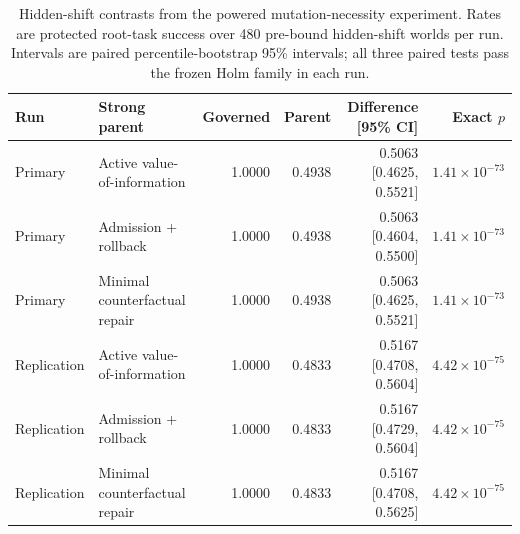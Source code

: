 \begin{table}[htbp]
\centering
\small
\setlength{\tabcolsep}{4pt}
\caption{Hidden-shift contrasts from the powered mutation-necessity experiment. Rates are protected root-task success over 480 pre-bound hidden-shift worlds per run. Intervals are paired percentile-bootstrap 95\% intervals; all three paired tests pass the frozen Holm family in each run.}
\label{tab:P1-T4}
\begin{tabular}{llrrrr}
\toprule
Run & Strong parent & Governed & Parent & Difference [95\% CI] & Exact $p$ \\
\midrule
Primary & Active value-of-information & 1.0000 & 0.4938 & 0.5063 [0.4625, 0.5521] & $1.41\times10^{-73}$ \\
Primary & Admission + rollback & 1.0000 & 0.4938 & 0.5063 [0.4604, 0.5500] & $1.41\times10^{-73}$ \\
Primary & Minimal counterfactual repair & 1.0000 & 0.4938 & 0.5063 [0.4625, 0.5521] & $1.41\times10^{-73}$ \\
\midrule
Replication & Active value-of-information & 1.0000 & 0.4833 & 0.5167 [0.4708, 0.5604] & $4.42\times10^{-75}$ \\
Replication & Admission + rollback & 1.0000 & 0.4833 & 0.5167 [0.4729, 0.5604] & $4.42\times10^{-75}$ \\
Replication & Minimal counterfactual repair & 1.0000 & 0.4833 & 0.5167 [0.4708, 0.5625] & $4.42\times10^{-75}$ \\
\bottomrule
\end{tabular}
\end{table}
